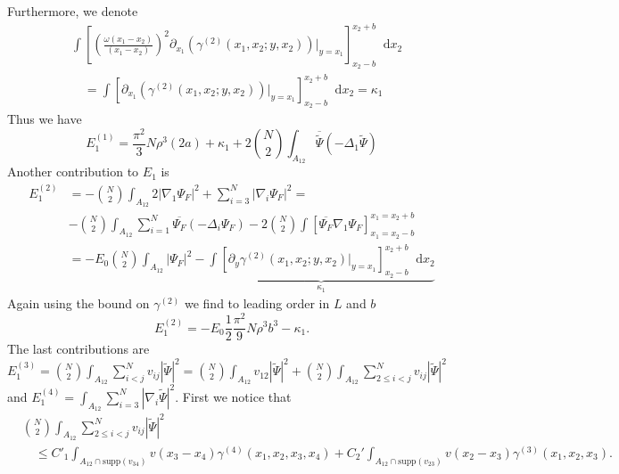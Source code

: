 \documentclass[a4paper,11pt]{article}
\newcommand{\supp}{\text{supp}}
\newcommand{\abs}[1]{\left\lvert #1 \right\rvert}
\newcommand*\diff{\mathop{}\!\mathrm{d}}
\numberwithin{equation}{section}
\begin{document}
		Furthermore, we denote \begin{equation}\label{EqGammaDeriv2.}
		\begin{aligned}
		&\int\left[\left(\frac{\omega(x_1-x_2)}{(x_1-x_2)}\right)^2\partial_{x_1}\left(\gamma^{(2)}(x_1,x_2;y,x_2)\right)\bigg\vert_{y=x_1}\right]_{x_2-b}^{x_2+b}\diff x_2\\
		&\quad=\int\left[\partial_{x_1}\left(\gamma^{(2)}(x_1,x_2;y,x_2)\right)\bigg\vert_{y=x_1}\right]_{x_2-b}^{x_2+b}\diff x_2=\kappa_1
		\end{aligned}
		\end{equation}
		Thus we have \begin{equation}
		E_1^{(1)}=\frac{\pi^2}{3}N\rho^3 (2a)+\kappa_1+2\binom{N}{2}\int_{A_{12}}\overline{\tilde{\Psi}}(-\Delta_1\tilde{\Psi})
		\end{equation}
		Another contribution to $ E_1 $ is \begin{equation}
		\begin{aligned}
		E_1^{(2)}&=-\binom{N}{2}\int_{A_{12}}2\abs{\nabla_1\Psi_F}^2+\sum_{i=3}^{N}\abs{\nabla_i\Psi_F}^2=\\&-\binom{N}{2}\int_{A_{12}}\sum_{i=1}^{N}\overline{\Psi_F}(-\Delta_i\Psi_F)-2\binom{N}{2}\int\left[\overline{\Psi_F}\nabla_1\Psi_F\right]_{x_1=x_2-b}^{x_1=x_2+b}\\
		&=-E_0\binom{N}{2}\int_{A_{12}}\abs{\Psi_F}^2-\underbrace{\int\left[\partial_y\gamma^{(2)}(x_1,x_2;y,x_2)\vert_{y=x_1}\right]_{x_2-b}^{x_2+b} \diff x_2}_{\kappa_1}
		\end{aligned}
		\end{equation}
		Again using the bound on $ \gamma^{(2)} $ we find to leading order in $ L $ and $ b $ \begin{equation}
		E_1^{(2)}=-E_0\frac{1}{2}\frac{\pi^2}{9}N\rho^3b^3-\kappa_1.
		\end{equation}
		The last contributions are $ E^{(3)}_1=\binom{N}{2}\int_{A_{12}} \sum_{i<j}^{N}v_{ij}\abs{\tilde{\Psi}}^2=\binom{N}{2}\int_{A_{12}}v_{12}\abs{\tilde{\Psi}}^2+\binom{N}{2}\int_{A_{12}} \sum_{2\leq i<j}^{N}v_{ij}\abs{\tilde{\Psi}}^2 $ and $ E_1^{(4)}=\int_{A_{12}}\sum_{i=3}^{N}\abs{\nabla_i\tilde{\Psi}}^2 $.
		First we notice that \begin{equation}
		\begin{aligned}
		&\binom{N}{2}\int_{A_{12}} \sum_{2\leq i<j}^{N}v_{ij}\abs{\tilde{\Psi}}^2\\&\quad\leq C'_1\int_{A_{12}\cap\supp(v_{34})}v(x_3-x_4)\gamma^{(4)}(x_1,x_2,x_3,x_4)+C_2'\int_{A_{12}\cap\supp(v_{23})}v(x_2-x_3)\gamma^{(3)}(x_1,x_2,x_3).
		\end{aligned}
		\end{equation}
\end{document}
